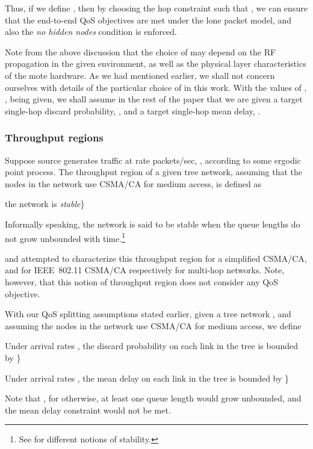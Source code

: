 \documentclass[12pt, draftclsnofoot, onecolumn]{IEEEtran}
\begin{document}
Thus, if we define , then by choosing the hop constraint  such that , we can ensure that the end-to-end QoS objectives are met under the lone packet model, and also the \emph{no hidden nodes} condition is enforced. 

Note from the above discussion that the choice of  may depend on the RF propagation in the given environment, as well as the physical layer characteristics of the mote hardware. As we had mentioned earlier, we shall not concern ourselves with details of the particular choice of  in this work. With the values of , ,  being given, we shall assume in the rest of the paper that we are given a target single-hop discard probability, , and a target single-hop mean delay, .  


\subsubsection{Throughput regions}
\label{subsubsec:throughput-def}
Suppose source  generates traffic at rate  packets/sec, , according to some ergodic point process. The throughput region of a given tree network, assuming that the nodes in the network use CSMA/CA for medium access, is defined as 
\begin{description}
\item  the network is \emph{stable}\}
\end{description}
Informally speaking, the network is said to be stable when the queue lengths do not grow unbounded with time.\footnote{See \cite{neely10stochastic-nw-optimization} for different notions of stability.} 

\cite{marbach11} and \cite{jindal09} attempted to characterize this throughput region for a simplified CSMA/CA, and for IEEE~802.11 CSMA/CA respectively for multi-hop networks. Note, however, that this notion of throughput region does not consider any QoS objective.

With our QoS splitting assumptions stated earlier, given a tree network , and assuming the nodes in the network use CSMA/CA for medium access, we define 
\begin{description}
\item  Under arrival rates , the discard probability on each link in the tree  is bounded by \}
\item  Under arrival rates , the mean delay on each link in the tree  is bounded by \}
\item 
\end{description}
Note that , for otherwise, at least one queue length would grow unbounded, and the mean delay constraint would not be met. 
\end{document}
